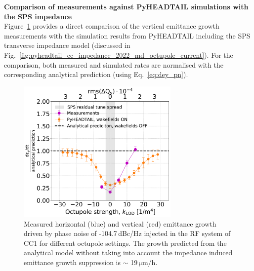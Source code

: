 \textbf{Comparison of measurements against PyHEADTAIL simulations with the SPS impedance}\\

Figure~\ref{fig:cc_md_2022_measurement_vs_pyheadtail_simualtion} provides a direct comparison of the vertical emittance growth measurements with the simulation results from PyHEADTAIL including the SPS transverse impedance model (discussed in Fig.~\ref{fig:pyheadtail_cc_impedance_2022_md_octupole_current}). For the comparison, both measured and simulated rates are normalised with the corresponding analytical prediction (using Eq.~\eqref{eq:dey_pn}). 

\begin{figure}[!h]
   \centering         
   \includegraphics[width=0.7\textwidth]{images/Ch8/deyRates_sps_270GeV_PN1e-8_400MHz_SPS_NewWakesAllcontributions_appendWakes_y-plane_WakesONvsOFF_QpxQpy1_6D_Nb5e5_intensity3e10Scan_simulations_vs_measurements_magenta_new_legend.png}
       \caption{Measured horizontal (blue) and vertical (red) emittance growth driven by phase noise of -104.7\,dBc/Hz injected in the RF system of CC1 for different octupole settings. The growth predicted from the analytical model without taking into account the impedance induced emittance growth suppression is $\sim$ 19\,$\mathrm{\mu m/h}$.}
       \label{fig:cc_md_2022_measurement_vs_pyheadtail_simualtion}
\end{figure}

